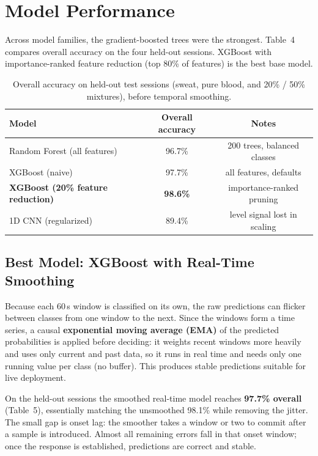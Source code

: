 \documentclass[11pt]{article}
\begin{document}
\section*{Model Performance}

Across model families, the gradient-boosted trees were the strongest. Table~4 compares
overall accuracy on the four held-out sessions. XGBoost with importance-ranked feature
reduction (top 80\% of features) is the best base model.

\begin{table}[H]
\centering
\caption{Overall accuracy on held-out test sessions (sweat, pure blood, and
20\% / 50\% mixtures), before temporal smoothing.}
\begin{tabular}{lcc}
    \toprule
    \textbf{Model} & \textbf{Overall accuracy} & \textbf{Notes} \\
    \midrule
    Random Forest (all features)     & 96.7\% & 200 trees, balanced classes \\
    XGBoost (naive)                  & 97.7\% & all features, defaults \\
    \textbf{XGBoost (20\% feature reduction)} & \textbf{98.6\%} & importance-ranked pruning \\
    1D CNN (regularized)             & 89.4\% & level signal lost in scaling \\
    \bottomrule
\end{tabular}
\end{table}

\subsection*{Best Model: XGBoost with Real-Time Smoothing}

Because each 60\,s window is classified on its own, the raw predictions can flicker between
classes from one window to the next. Since the windows form a time series, a causal
\textbf{exponential moving average (EMA)} of the predicted probabilities is applied before
deciding: it weights recent windows more heavily and uses only current and past data, so it
runs in real time and needs only one running value per class (no buffer). This produces
stable predictions suitable for live deployment.

On the held-out sessions the smoothed real-time model reaches \textbf{97.7\% overall}
(Table~5), essentially matching the unsmoothed 98.1\% while removing the jitter. The small
gap is onset lag: the smoother takes a window or two to commit after a sample is introduced.
Almost all remaining errors fall in that onset window; once the response is established,
predictions are correct and stable.
\end{document}
